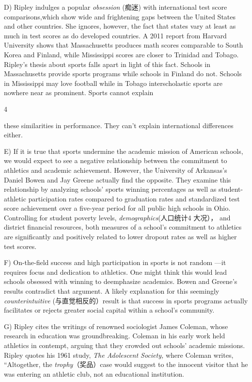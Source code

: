 \documentclass[UTF8,11pt]{ctexart}
\begin{document}
D) Ripley indulges a popular\textit{ obsession} (痴迷) with international test score comparisons,which show wide and frightening gaps between the United States and other countries. She ignores, however, the fact that states vary at least as much in test scores as do developed countries. A 2011 report from Harvard University shows that Massachusetts produces math scores comparable to South Korea and Finland, while Mississippi scores are closer to Trinidad and Tobago. Ripley’s thesis about sports falls apart in light of this fact. Schools in Massachusetts provide sports programs while schools in Finland do not. Schools in Mississippi may love football while in Tobago interscholastic sports are nowhere near as prominent. Sports cannot explain


4


these similarities in performance. They can’t explain international differences either.


E) If it is true that sports undermine the academic mission of American schools, we would expect to see a negative relationship between the commitment to athletics and academic achievement. However, the University of Arkansas’s Daniel Bowen and Jay Greene actually find the opposite. They examine this relationship by analyzing schools’ sports winning percentages as well as student-athletic participation rates compared to graduation rates and standardized test score achievement over a five-year period for all public high schools in Ohio. Controlling for student poverty levels,\textit{ demographics}(人口统计4 大况）， and district financial resources, both measures of a school’s commitment to athletics are significantly and positively related to lower dropout rates as well as higher test scores.


F) On-the-field success and high participation in sports is not random —it requires focus and dedication to athletics. One might think this would lead schools obsessed with winning to deemphasize academics. Bowen and Greene’s results contradict that argument. A likely explanation for this seemingly\textit{ counterintuitive} (与直觉相反的）result is that success in sports programs actually facilitates or rejects greater social capital within a school’s community.


G) Ripley cites the writings of renowned sociologist James Coleman, whose research in education was groundbreaking. Coleman in his early work held athletics in contempt, arguing that they crowded out schools’ academic missions. Ripley quotes his 1961 study,\textit{ The Adolescent Society,} where Coleman writes, “Altogether, the\textit{ trophy}（奖品）case would suggest to the innocent visitor that he was entering an athletic club, not an educational institution.
\end{document}
